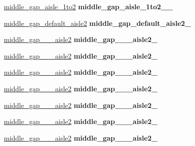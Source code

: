 \begin{DoxyCompactItemize}
\hyperlink{structPresetLocation}{middle\+\_\+gap\+\_\+aisle\+\_\+1to2} {\bfseries middle\+\_\+gap\+\_\+aisle\+\_\+1to2\+\_\+\_\+}
\item 
\mbox{\label{classGantryControl_adafbbcf9da28b90c14afb1ef87da6270}} 
\hyperlink{structPresetLocation}{middle\+\_\+gap\+\_\+default\+\_\+aisle2} {\bfseries middle\+\_\+gap\+\_\+default\+\_\+aisle2\+\_\+}
\item 
\mbox{\label{classGantryControl_a2a6a0a282f5827eb51b2504263b9454d}} 
\hyperlink{structPresetLocation}{middle\+\_\+gap\+\_\+\_\+\_\+aisle2} {\bfseries middle\+\_\+gap\+\_\+\_\+\_\+aisle2\+\_\+}
\item 
\mbox{\label{classGantryControl_a533f1abf685431b2b29f131d78b5216b}} 
\hyperlink{structPresetLocation}{middle\+\_\+gap\+\_\+\_\+\_\+aisle2} {\bfseries middle\+\_\+gap\+\_\+\_\+\_\+aisle2\+\_\+}
\item 
\mbox{\label{classGantryControl_a065ecc63b50c0ce328115333a3849a96}} 
\hyperlink{structPresetLocation}{middle\+\_\+gap\+\_\+\_\+\_\+aisle2} {\bfseries middle\+\_\+gap\+\_\+\_\+\_\+aisle2\+\_\+}
\item 
\mbox{\label{classGantryControl_afa4b57168484058f87be78c66cde2a12}} 
\hyperlink{structPresetLocation}{middle\+\_\+gap\+\_\+\_\+\_\+aisle2} {\bfseries middle\+\_\+gap\+\_\+\_\+\_\+aisle2\+\_\+}
\item 
\mbox{\label{classGantryControl_add02bdb69879f5e28a6574307c20428a}} 
\hyperlink{structPresetLocation}{middle\+\_\+gap\+\_\+\_\+\_\+aisle2} {\bfseries middle\+\_\+gap\+\_\+\_\+\_\+aisle2\+\_\+}
\item 
\mbox{\label{classGantryControl_aa2dff98a310c33843581db2cd6758a4b}} 
\hyperlink{structPresetLocation}{middle\+\_\+gap\+\_\+\_\+\_\+aisle2} {\bfseries middle\+\_\+gap\+\_\+\_\+\_\+aisle2\+\_\+}
\item 
\mbox{\label{classGantryControl_a4ce50783f95a0d98ec79b96375b32531}} 
\hyperlink{structPresetLocation}{middle\+\_\+gap\+\_\+\_\+\_\+aisle2} {\bfseries middle\+\_\+gap\+\_\+\_\+\_\+aisle2\+\_\+}

\end{DoxyCompactItemize}
